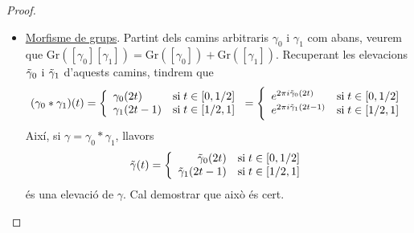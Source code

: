 \documentclass[../main.tex]{subfiles}
\begin{document}
\begin{proof}
\begin{itemize}
    \item \underline{Morfisme de grups}. Partint dels camins arbitraris $\gamma_0$ i $\gamma_1$ com abans, veurem que $\mathrm{Gr}([\gamma_0][\gamma_1]) = \mathrm{Gr}([\gamma_0]) + \mathrm{Gr}([\gamma_1])$. Recuperant les elevacions $\Tilde{\gamma}_0$ i $\Tilde{\gamma}_1$ d'aquests camins, tindrem que
    \begin{equation}
        \notag
        (\gamma_0*\gamma_1)(t) =\left\{
        \begin{array}{ll}
            \gamma_0(2t) & \mathrm{si}\;t\in[0,1/2] \\
            \gamma_1(2t-1) & \mathrm{si}\;t\in[1/2,1]
        \end{array}
        \right.
        =
        \left\{
        \begin{array}{ll}
            e^{2\pi i\Tilde{\gamma}_0(2t)} & \mathrm{si}\;t\in[0,1/2] \\
            e^{2\pi i\tilde{\gamma}_1(2t-1)} & \mathrm{si}\;t\in[1/2,1]
        \end{array}
        \right.
    \end{equation}
    Així, si $\gamma = \gamma_0*\gamma_1$, llavors
    \begin{equation}
        \notag
        \tilde{\gamma}(t) = \left\{
        \begin{array}{rl}
            \tilde{\gamma}_0(2t) & \mathrm{si}\;t\in[0,1/2] \\
            \tilde{\gamma}_1(2t-1) & \mathrm{si}\;t\in[1/2,1]
        \end{array}
        \right.
    \end{equation}
    és una elevació de $\gamma$. Cal demostrar que això és cert.
    

\end{itemize}
\end{proof}
\end{document}
